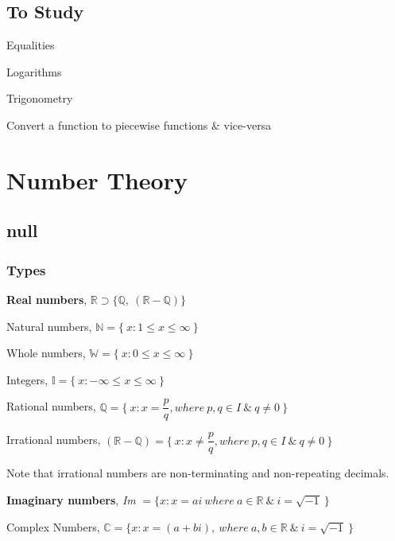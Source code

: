 \documentclass[openany]{book}
\begin{document}
\tableofcontents

\mainmatter

\raggedright

\chapter{To Study}

Equalities

Logarithms

Trigonometry

Convert a function to piecewise functions \& vice-versa


\part{Number Theory}

\chapter{null}

\section{Types}

\begin{outline}
	\item {\bf Real numbers}, $\mathbb{R}\supset \{ \mathbb{Q,\ (R-Q)} \} $
	
	\begin{outline}

		\item Natural numbers,
		$ \mathbb{N}=\{\ x : 1\leq x \leq\infty\ \} $
		\item Whole numbers,
		$ \mathbb{W}=\{\ x : 0\leq x \leq\infty\ \} $
		\item Integers,
		$ \mathbb{I}=\{\ x: -\infty\leq x \leq\infty\ \} $
		\item Rational numbers,
		$ \mathbb{Q}=\{\ x : x = \dfrac{p}{q}, where\ p,q \in I\ \&\ q \neq 0\ \} $
		\item Irrational numbers,
		$ \mathbb{(R-Q)}=\{\ x : x \neq \dfrac{p}{q}, where\ p,q \in I\ \&\ q \neq 0\ \} $
		
		Note that irrational numbers are non-terminating and non-repeating decimals.
		
	\end{outline}
	
	\item {\bf Imaginary numbers}, \textit{Im}
	\( =\{ x : x = ai\ where\ a \in \mathbb{R}\ \&\ i=\sqrt{-1}\ \} \)
	
	\begin{outline}

		\item Complex Numbers,
		\( \mathbb{C}=\{ x : x=(a+bi),\ where\
		a,b \in \mathbb{R}\ \&\ i=\sqrt{-1}\ \} \)
		
	\end{outline}
	
\end{outline}
\end{document}
